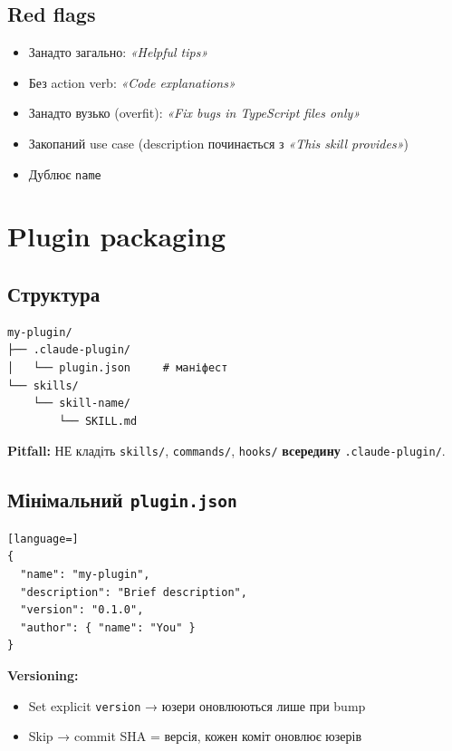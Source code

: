 \documentclass[11pt,a4paper]{article}
\begin{document}
\subsection{Red flags}

\begin{itemize}
\item Занадто загально: \emph{«Helpful tips»}
\item Без action verb: \emph{«Code explanations»}
\item Занадто вузько (overfit): \emph{«Fix bugs in TypeScript files only»}
\item Закопаний use case (description починається з \emph{«This skill provides»})
\item Дублює \texttt{name}
\end{itemize}

\section{Plugin packaging}

\subsection{Структура}

\begin{lstlisting}
my-plugin/
├── .claude-plugin/
│   └── plugin.json     # маніфест
└── skills/
    └── skill-name/
        └── SKILL.md
\end{lstlisting}

\textbf{Pitfall:} НЕ кладіть \texttt{skills/}, \texttt{commands/}, \texttt{hooks/} \textbf{всередину} \texttt{.claude-plugin/}.

\subsection{Мінімальний \texttt{plugin.json}}

\begin{lstlisting}[language=]
{
  "name": "my-plugin",
  "description": "Brief description",
  "version": "0.1.0",
  "author": { "name": "You" }
}
\end{lstlisting}

\textbf{Versioning:}
\begin{itemize}
\item Set explicit \texttt{version} → юзери оновлюються лише при bump
\item Skip → commit SHA = версія, кожен коміт оновлює юзерів
\end{itemize}
\end{document}
